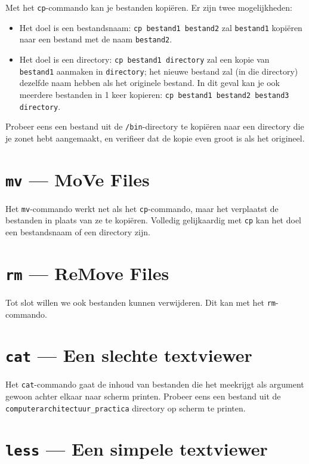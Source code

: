 \documentclass[a4paper,twoside,openany]{memoir}
\begin{document}
Met het \verb!cp!-commando kan je bestanden kopiëren. Er zijn twee mogelijkheden:

\begin{itemize}

  \item Het doel is een bestandsnaam: \verb!cp bestand1 bestand2! zal
    \verb!bestand1! kopiëren naar een bestand met de naam \verb!bestand2!.

  \item Het doel is een directory: \verb!cp bestand1 directory! zal een kopie
    van \verb!bestand1! aanmaken in \verb!directory!; het nieuwe bestand zal (in
    die directory) dezelfde naam hebben als het originele bestand. In dit geval
    kan je ook meerdere bestanden in 1 keer kopieren: \verb!cp bestand1 bestand2 bestand3 directory!.

\end{itemize}

Probeer eens een bestand uit de \verb!/bin!-directory te kopiëren naar een
directory die je zonet hebt aangemaakt, en verifieer dat de kopie even groot is
als het origineel.

\section{\texttt{mv} --- MoVe Files}

Het \verb!mv!-commando werkt net als het \verb!cp!-commando, maar het verplaatst
de bestanden in plaats van ze te kopiëren. Volledig gelijkaardig met \verb!cp!
kan het doel een bestandsnaam of een directory zijn.

\section{\texttt{rm} --- ReMove Files}

Tot slot willen we ook bestanden kunnen verwijderen. Dit kan met het
\verb!rm!-commando.

\section{\texttt{cat} --- Een slechte textviewer}

Het \verb!cat!-commando gaat de inhoud van bestanden die het meekrijgt als
argument gewoon achter elkaar naar scherm printen. Probeer eens een bestand uit
de \verb!computerarchitectuur_practica! directory op scherm te printen.

\section{\texttt{less} --- Een simpele textviewer}
\end{document}
